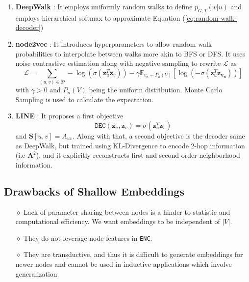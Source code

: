\begin{enumerate}
\begin{enumerate}
	\item \textbf{DeepWalk} \cite{deepwalk}: 
	It employs uniformly random walks to define $p_{G,T}(v|u)$ and employs hierarchical softmax \cite{hierarchical-softmax} to approximate Equation (\ref{eq:random-walk-decoder})
	\item \textbf{node2vec} \cite{node2vec}: It introduces hyperparameters to allow random walk probabilities to interpolate between walks more akin to BFS or DFS. It uses noise contrastive estimation along with negative sampling to rewrite $\mathcal{L}$ as
	\begin{equation}
	\mathcal{L} = \sum_{(u,v)\in\mathcal{D}} -\log(\sigma(\mathbf{z}_u^T\mathbf{z}_v)) - \gamma \mathbb{E}_{v_n \sim P_n(V)}[\log(-\sigma(\mathbf{z}_u^T \mathbf{z_{v_n}}))]
	\end{equation}
	with $\gamma > 0$ and $P_n(V)$ being the uniform distribution. Monte Carlo Sampling is used to calculate the expectation.
	\item \textbf{LINE} \cite{line}: It proposes a first objective
	\begin{equation}
		\texttt{DEC}(\mathbf{z}_u, \mathbf{z}_v) = \sigma(\mathbf{z}_u^T\mathbf{z}_v)
	\end{equation}
and $\mathbf{S}[u,v] = A_{uv}$. Along with that, a second objective is the decoder same as DeepWalk, but trained using KL-Divergence to encode 2-hop information (i.e $\mathbf{A}^2$), and it explicitly reconstructs first and second-order neighborhood information.
\end{enumerate}
\end{enumerate}
\subsection{Drawbacks of Shallow Embeddings}
\begin{itemize}
	\item[$\diamond$] Lack of parameter sharing between nodes is a hinder to statistic and computational efficiency. We want embeddings to be independent of $|V|$.
	\item[$\diamond$] They do not leverage node features in \texttt{ENC}.
	\item[$\diamond$] They are transductive, and thus it is difficult to generate embeddings for newer nodes and cannot be used in inductive applications which involve generalization.
\end{itemize}